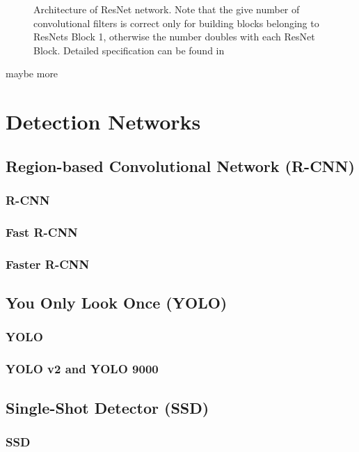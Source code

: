 \begin{figure}
\begin{multicols}{3}
    \end{multicols}
    
    \caption{Architecture of ResNet network.
    Note that the give number of convolutional filters is correct only for building blocks belonging to ResNets Block 1, otherwise the number doubles with each ResNet Block. Detailed specification can be found in }
\end{figure}

maybe more

\section{Detection Networks}

\subsection{Region-based Convolutional Network (R-CNN)}
\subsubsection{R-CNN}
\subsubsection{Fast R-CNN}
\subsubsection{Faster R-CNN}

\subsection{You Only Look Once (YOLO)}
\subsubsection{YOLO}
\label{yolo}
\subsubsection{YOLO v2 and YOLO 9000}

\subsection{Single-Shot Detector (SSD)}
\label{ssd}
\subsubsection{SSD}

